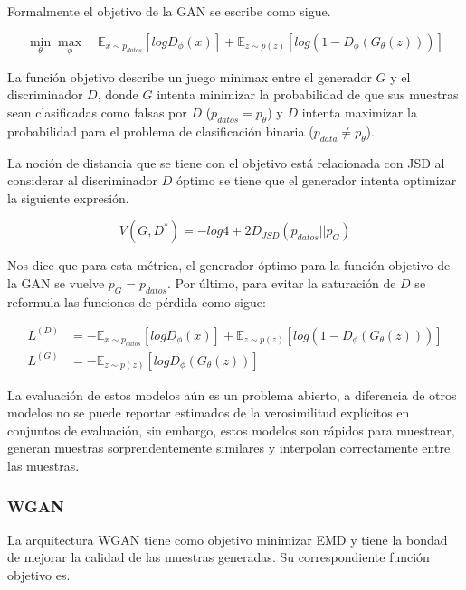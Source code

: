 Formalmente el objetivo de la GAN se escribe como sigue.

\begin{equation}
	\label{eq:GANobjective}
	\underset{\theta}{\min}\underset{\phi}{\max} \quad \mathbb{E}_{x \sim  p_{datos}}\left[ logD_\phi (x) \right] + \mathbb{E}_{z\sim p(z)}\left[ log( 1 - D_\phi ( G_\theta (z) ) )\right]
\end{equation}

La función objetivo describe un juego minimax entre el generador $G$ y el discriminador $D$, donde $G$ intenta minimizar la probabilidad de que sus muestras sean clasificadas como falsas por $D$ ($p_{datos} = p_\theta $)  y $D$ intenta maximizar la probabilidad para el problema de clasificación binaria ($p_{data} \neq p_\theta$).

La noción de distancia que se tiene con el objetivo está relacionada con JSD al considerar al discriminador $D$ óptimo se tiene que el generador intenta optimizar la siguiente expresión.

\begin{equation}
	V(G, D^{*}) =  -log4 + 2D_{JSD}(p_{datos}||p_{G})
\end{equation}

Nos dice que para esta métrica, el generador óptimo para la función objetivo de la GAN se vuelve $p_G = p_{datos}$. Por último, para evitar la saturación de $D$ se reformula las funciones de pérdida como sigue: 

\begin{align}
	L^{(D)} &= - \mathbb{E}_{x \sim  p_{datos}}\left[ logD_\phi (x) \right] + \mathbb{E}_{z\sim p(z)}\left[ log( 1 - D_\phi ( G_\theta (z) ) )\right]\\
	L^{(G)} &= - \mathbb{E}_{z \sim  p(z)} \left[ logD_\phi ( G_\theta (z) )\right]
\end{align}

La evaluación de estos modelos aún es un problema abierto, a diferencia de otros modelos no se puede reportar estimados de la verosimilitud explícitos en conjuntos de evaluación, sin embargo, estos modelos son rápidos para muestrear, generan muestras sorprendentemente similares y interpolan correctamente entre las muestras.

\subsubsection{WGAN}

La arquitectura WGAN tiene como objetivo minimizar EMD y tiene la bondad de mejorar la calidad de las muestras generadas. Su correspondiente función objetivo es.

